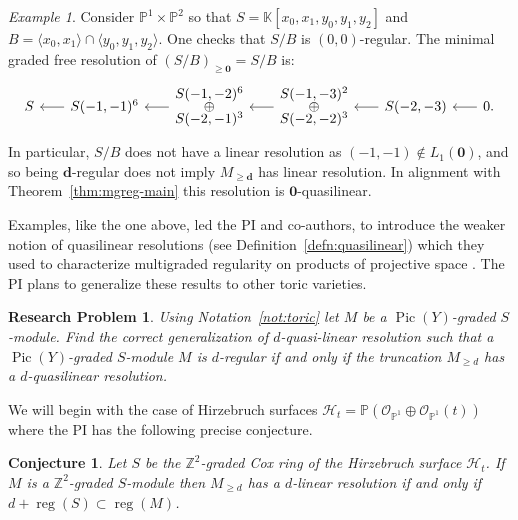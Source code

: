 \documentclass[11pt,reqno]{amsart}
\newtheorem{problem}[lemma]{Research Problem}
\newtheorem{conjecture}[lemma]{Conjecture}
\theoremstyle{remark}
\newtheorem{example}[lemma]{Example}
\newcommand{\reg}{\operatorname{reg}}
\newcommand{\Pic}{\operatorname{Pic}}
\newcommand{\dd}{\mathbf{d}}
\newcommand{\zero}{\mathbf{0}}
\newcommand{\KK}{\mathbb{K}}
\newcommand{\PP}{\mathbb{P}}
\newcommand{\ZZ}{\mathbb{Z}}
\newcommand{\cH}{\mathcal{H}}
\newcommand{\cO}{\mathcal{O}}
\begin{document}
\begin{example}
Consider $\PP^{1}\times \PP^{2}$ so that $S=\KK[x_{0},x_{1},y_{0},y_{1},y_{2}]$ and $B=\langle x_{0},x_{1}\rangle\cap\langle y_{0},y_{1},y_{2}\rangle$. One checks that $S/B$ is $(0,0)$-regular. The minimal graded free resolution of $(S/B)_{\geq\zero}=S/B$ is: 
	\[\begin{tikzcd}[column sep=1.75em]
	S & \lar S(-1,-1)^6 & \lar
	  \begin{matrix}
	    S(-1,-2)^6\\[-3pt]
	    \oplus \\[-3pt]
	    S(-2,-1)^3
	  \end{matrix}
	  &
	  \lar
	  \begin{matrix}
	    S(-1,-3)^2\\[-3pt]
	    \oplus \\[-3pt]
	    S(-2,-2)^3
	  \end{matrix}
	  &\lar
	  S(-2,-3)
	  & \lar 0.
	\end{tikzcd}\]
In particular, $S/B$ does not have a linear resolution as $(-1,-1) \not\in L_1(\zero)$, and so being $\dd$-regular does not imply $M_{\geq\dd}$ has linear resolution. In alignment with Theorem~\ref{thm:mgreg-main} this resolution is $\zero$-quasilinear.
\end{example}

Examples, like the one above, led the PI and co-authors, to introduce the weaker notion of quasilinear resolutions (see Definition~\ref{defn:quasilinear}) which they used to characterize multigraded regularity on products of projective space \cite{bruceHellerSayrafi21}. The PI plans to generalize these results to other toric varieties. 

 \begin{problem}\label{prob:eisenbud-goto}
 	Using Notation~\ref{not:toric} let $M$ be a $\Pic(Y)$-graded $S$-module.  Find the correct generalization of $d$-quasi-linear resolution such that a $\Pic(Y)$-graded $S$-module  $M$ is $d$-regular if and only if the truncation $M_{\geq d}$ has a $d$-quasilinear resolution. 
\end{problem}

We will begin with the case of Hirzebruch surfaces $\cH_t=\PP(\cO_{\PP^1}\oplus \cO_{\PP^1}(t))$ where the PI has the following precise conjecture. 

 \begin{conjecture}\label{conj:eg-hirzebruch}
	Let $S$ be the $\ZZ^2$-graded Cox ring of the Hirzebruch surface $\cH_{t}$. If $M$ is a $\ZZ^2$-graded $S$-module then $M_{\geq d}$ has a $d$-linear resolution if and only if $d+\reg(S) \subset \reg(M)$. 
\end{conjecture}
\end{document}

